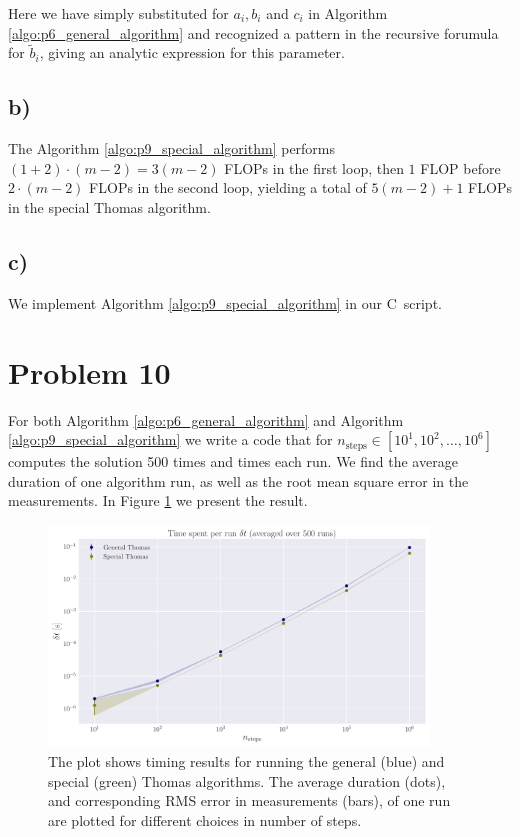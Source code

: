\documentclass[english,notitlepage,nofootinbib]{revtex4-1}  %
\newcommand{\Fig}[1]{Figure \ref{fig:#1}}
\newcommand{\Algo}[1]{Algorithm \ref{algo:#1}}
\newcommand{\CC}{C\nolinebreak\hspace{-.05em}\raisebox{.4ex}{\tiny\bf +}\nolinebreak\hspace{-.10em}\raisebox{.4ex}{\tiny\bf +}}
\begin{document}
Here we have simply substituted for $a_i, b_i$ and $c_i$ in \Algo{p6_general_algorithm} and recognized a pattern in the recursive forumula for $\tilde{b}_i$, giving an analytic expression for this parameter.


\subsection*{b)}

The \Algo{p9_special_algorithm} performs $(1+2)\cdot (m-2) = 3(m-2)$ FLOPs in the first loop, then $1$ FLOP before $2 \cdot (m-2)$ FLOPs in the second loop, yielding a total of $5(m-2)+1$ FLOPs in the special Thomas algorithm.

\subsection*{c)}

We implement \Algo{p9_special_algorithm} in our \CC\, script. 

\section*{Problem 10}

For both \Algo{p6_general_algorithm} and \Algo{p9_special_algorithm} we write a code that for $n_\text{steps}\in[10^{1}, 10^{2}, \dots, 10^{6}]$ computes the solution 500 times and times each run. We find the average duration of one algorithm run, as well as the root mean square error in the measurements. In \Fig{p10_timed} we present the result.

\begin{figure}[h!]
    \centering
    \includegraphics[width=0.9\textwidth]{algorithms_timed.pdf}
    \caption{ The plot shows timing results for running the general (blue) and special (green) Thomas algorithms. The average duration (dots), and corresponding RMS error in measurements (bars), of one run are plotted for different choices in number of steps.}\label{fig:p10_timed}
\end{figure}
\end{document}
